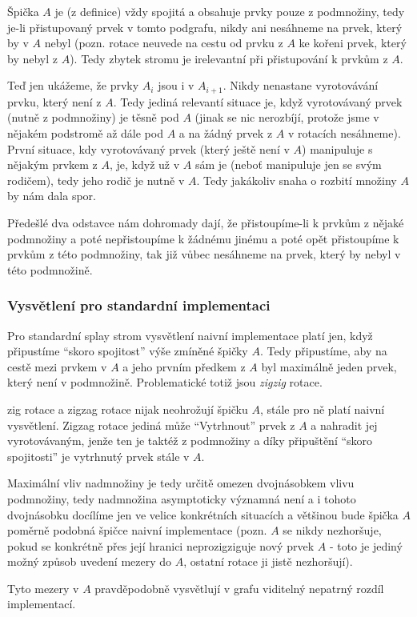 \documentclass[a4paper,12pt]{article} %
\begin{document}
Špička $A$ je (z definice) vždy spojitá a obsahuje prvky pouze z podmnožiny, tedy je-li přistupovaný prvek v tomto podgrafu, nikdy ani nesáhneme na prvek, který by v $A$ nebyl (pozn. rotace neuvede na cestu od prvku z $A$ ke kořeni prvek, který by nebyl z $A$). Tedy zbytek stromu je irelevantní při přistupování k prvkům z $A$.

Teď jen ukážeme, že prvky $A_i$ jsou i v $A_{i+1}$. Nikdy nenastane vyrotovávání prvku, který není z $A$. Tedy jediná relevantí situace je, když vyrotovávaný prvek (nutně z podmnožiny) je těsně pod $A$ (jinak se nic nerozbíjí, protože jsme v nějakém podstromě až dále pod $A$ a na žádný prvek z $A$ v rotacích nesáhneme). První situace, kdy vyrotovávaný prvek (který ještě není v $A$) manipuluje s nějakým prvkem z $A$, je, když už v $A$ sám je (neboť manipuluje jen se svým rodičem), tedy jeho rodič je nutně v $A$. Tedy jakákoliv snaha o rozbití množiny $A$ by nám dala spor.

Předešlé dva odstavce nám dohromady dají, že přistoupíme-li k prvkům z nějaké podmnožiny a poté nepřistoupíme k žádnému jinému a poté opět přistoupíme k prvkům z této podmnožiny, tak již vůbec nesáhneme na prvek, který by nebyl v této podmnožině.

\subsubsection*{Vysvětlení pro standardní implementaci}

Pro standardní splay strom vysvětlení naivní implementace platí jen, když připustíme ``skoro spojitost'' výše zmíněné špičky $A$. Tedy připustíme, aby na cestě mezi prvkem v $A$ a jeho prvním předkem z $A$ byl maximálně jeden prvek, který není v podmnožině. Problematické totiž jsou \textit{zigzig} rotace.

zig rotace a zigzag rotace nijak neohrožují špičku $A$, stále pro ně platí naivní vysvětlení. Zigzag rotace jediná může ``Vytrhnout'' prvek z $A$ a nahradit jej vyrotovávaným, jenže ten je taktéž z podmnožiny a díky připuštění ``skoro spojitosti'' je vytrhnutý prvek stále v $A$.

Maximální vliv nadmnožiny je tedy určitě omezen dvojnásobkem vlivu podmnožiny, tedy nadmnožina asymptoticky významná není a i tohoto dvojnásobku docílíme jen ve velice konkrétních situacích a většinou bude špička $A$ poměrně podobná špičce naivní implementace (pozn. $A$ se nikdy nezhoršuje, pokud se konkrétně přes její hranici neprozigziguje nový prvek $A$ - toto je jediný možný způsob uvedení mezery do $A$, ostatní rotace ji jistě nezhoršují).

Tyto mezery v $A$ pravděpodobně vysvětlují v grafu viditelný nepatrný rozdíl implementací.
\end{document}
